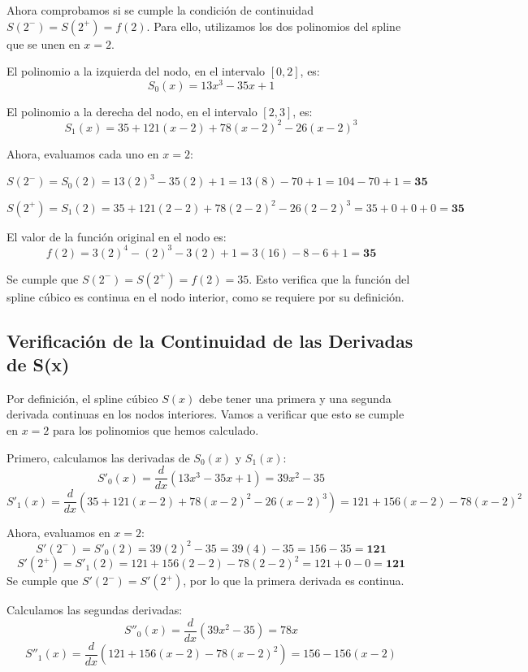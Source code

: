 \documentclass{article}
\begin{document}
Ahora comprobamos si se cumple la condición de continuidad $S(2^-) = S(2^+) = f(2)$. Para ello, utilizamos los dos polinomios del spline que se unen en $x=2$.

El polinomio a la izquierda del nodo, en el intervalo $[0,2]$, es:
$$ S_0(x) = 13x^3 - 35x + 1 $$

El polinomio a la derecha del nodo, en el intervalo $[2,3]$, es:
$$ S_1(x) = 35 + 121(x-2) + 78(x-2)^2 - 26(x-2)^3 $$

Ahora, evaluamos cada uno en $x=2$:

$$ S(2^-) = S_0(2) = 13(2)^3 - 35(2) + 1 = 13(8) - 70 + 1 = 104 - 70 + 1 = \mathbf{35} $$

$$ S(2^+) = S_1(2) = 35 + 121(2-2) + 78(2-2)^2 - 26(2-2)^3 = 35 + 0 + 0 + 0 = \mathbf{35} $$

El valor de la función original en el nodo es:
$$ f(2) = 3(2)^4 - (2)^3 - 3(2) + 1 = 3(16) - 8 - 6 + 1 = \mathbf{35} $$

Se cumple que $S(2^-) = S(2^+) = f(2) = 35$. Esto verifica que la función del spline cúbico es continua en el nodo interior, como se requiere por su definición.

\subsection{Verificación de la Continuidad de las Derivadas de S(x)}

Por definición, el spline cúbico $S(x)$ debe tener una primera y una segunda derivada continuas en los nodos interiores. Vamos a verificar que esto se cumple en $x=2$ para los polinomios que hemos calculado.


Primero, calculamos las derivadas de $S_0(x)$ y $S_1(x)$:
$$ S'_0(x) = \frac{d}{dx}(13x^3 - 35x + 1) = 39x^2 - 35 $$
$$ S'_1(x) = \frac{d}{dx}\left(35 + 121(x-2) + 78(x-2)^2 - 26(x-2)^3\right) = 121 + 156(x-2) - 78(x-2)^2 $$

Ahora, evaluamos en $x=2$:
$$ S'(2^-) = S'_0(2) = 39(2)^2 - 35 = 39(4) - 35 = 156 - 35 = \mathbf{121} $$
$$ S'(2^+) = S'_1(2) = 121 + 156(2-2) - 78(2-2)^2 = 121 + 0 - 0 = \mathbf{121} $$
Se cumple que $S'(2^-) = S'(2^+)$, por lo que la primera derivada es continua.

\vspace{1cm}


Calculamos las segundas derivadas:
$$ S''_0(x) = \frac{d}{dx}(39x^2 - 35) = 78x $$
$$ S''_1(x) = \frac{d}{dx}\left(121 + 156(x-2) - 78(x-2)^2\right) = 156 - 156(x-2) $$
\end{document}
